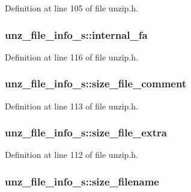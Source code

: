 Definition at line 105 of file unzip.\+h.

\hypertarget{structunz__file__info__s_aa20738bf82bca71cc950b9475b5d8c3c}{
\subsubsection[{internal\+\_\+fa}]{ unz\+\_\+file\+\_\+info\+\_\+s\+::internal\+\_\+fa}}\label{structunz__file__info__s_aa20738bf82bca71cc950b9475b5d8c3c}


Definition at line 116 of file unzip.\+h.

\hypertarget{structunz__file__info__s_afa9feffb3b9c9c03e02599118d5f548e}{
\subsubsection[{size\+\_\+file\+\_\+comment}]{ unz\+\_\+file\+\_\+info\+\_\+s\+::size\+\_\+file\+\_\+comment}}\label{structunz__file__info__s_afa9feffb3b9c9c03e02599118d5f548e}


Definition at line 113 of file unzip.\+h.

\hypertarget{structunz__file__info__s_a479402dcb3555c922e3ce87c8f967990}{
\subsubsection[{size\+\_\+file\+\_\+extra}]{ unz\+\_\+file\+\_\+info\+\_\+s\+::size\+\_\+file\+\_\+extra}}\label{structunz__file__info__s_a479402dcb3555c922e3ce87c8f967990}


Definition at line 112 of file unzip.\+h.

\hypertarget{structunz__file__info__s_ae4f2f81a5301f7df9014838a56a496c6}{
\subsubsection[{size\+\_\+filename}]{ unz\+\_\+file\+\_\+info\+\_\+s\+::size\+\_\+filename}}\label{structunz__file__info__s_ae4f2f81a5301f7df9014838a56a496c6}


